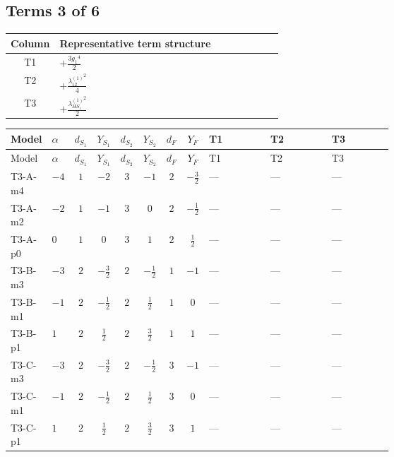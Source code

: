 \documentclass[8pt]{article}
\begin{document}
\begin{landscape}
\subsection*{Terms 3 of 6}
\begin{center}
\begin{tabular}{@{}c >{\raggedright\arraybackslash}p{0.82\linewidth}@{}}
\toprule
Column & Representative term structure \\
\midrule
T1 & \(\displaystyle +\frac{3 {g_1}^4}{2}\) \\
\midrule
T2 & \(\displaystyle +\frac{{\lambda_{12}^{(1)}}^2}{4}\) \\
\midrule
T3 & \(\displaystyle +\frac{{\lambda_{HS_1}^{(1)}}^2}{2}\) \\
\midrule
\bottomrule
\end{tabular}
\end{center}
\smallskip
\tiny
\begin{longtable}{@{}llcccccc >{\raggedright\arraybackslash}p{0.21\linewidth} >{\raggedright\arraybackslash}p{0.21\linewidth} >{\raggedright\arraybackslash}p{0.21\linewidth}@{}}
\toprule
Model & $\alpha$ & $d_{S_1}$ & $Y_{S_1}$ & $d_{S_2}$ & $Y_{S_2}$ & $d_F$ & $Y_F$ & T1 & T2 & T3 \\
\midrule
\endfirsthead
\toprule
Model & $\alpha$ & $d_{S_1}$ & $Y_{S_1}$ & $d_{S_2}$ & $Y_{S_2}$ & $d_F$ & $Y_F$ & T1 & T2 & T3 \\
\midrule
\endhead
T3-A-m4 & $-4$ & $1$ & $-2$ & $3$ & $-1$ & $2$ & $-\frac{3}{2}$ & --- & --- & --- \\
\midrule
T3-A-m2 & $-2$ & $1$ & $-1$ & $3$ & $0$ & $2$ & $-\frac{1}{2}$ & --- & --- & --- \\
\midrule
T3-A-p0 & $0$ & $1$ & $0$ & $3$ & $1$ & $2$ & $\frac{1}{2}$ & --- & --- & --- \\
\midrule
T3-B-m3 & $-3$ & $2$ & $-\frac{3}{2}$ & $2$ & $-\frac{1}{2}$ & $1$ & $-1$ & --- & --- & --- \\
\midrule
T3-B-m1 & $-1$ & $2$ & $-\frac{1}{2}$ & $2$ & $\frac{1}{2}$ & $1$ & $0$ & --- & --- & --- \\
\midrule
T3-B-p1 & $1$ & $2$ & $\frac{1}{2}$ & $2$ & $\frac{3}{2}$ & $1$ & $1$ & --- & --- & --- \\
\midrule
T3-C-m3 & $-3$ & $2$ & $-\frac{3}{2}$ & $2$ & $-\frac{1}{2}$ & $3$ & $-1$ & --- & --- & --- \\
\midrule
T3-C-m1 & $-1$ & $2$ & $-\frac{1}{2}$ & $2$ & $\frac{1}{2}$ & $3$ & $0$ & --- & --- & --- \\
\midrule
T3-C-p1 & $1$ & $2$ & $\frac{1}{2}$ & $2$ & $\frac{3}{2}$ & $3$ & $1$ & --- & --- & --- \\

\end{longtable}
\end{landscape}
\end{document}
